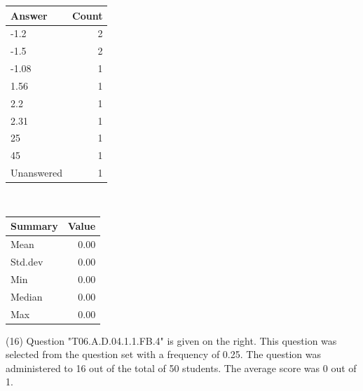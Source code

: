 \documentclass[12pt,english,nohyper]{tufte-handout}\usepackage[]{graphicx}\usepackage[]{color}
\begin{document}
\begin{center}%
\begin{tabular}{lr}
  \hline
Answer & Count \\ 
  \hline
-1.2 &   2 \\ 
  -1.5 &   2 \\ 
  -1.08 &   1 \\ 
  1.56 &   1 \\ 
  2.2 &   1 \\ 
  2.31 &   1 \\ 
  25 &   1 \\ 
  45 &   1 \\ 
  Unanswered &   1 \\ 
   \hline
\end{tabular}
~~~~~~~~%
\begin{tabular}{lr}
  \hline
Summary & Value \\ 
  \hline
Mean & 0.00 \\ 
  Std.dev & 0.00 \\ 
  Min & 0.00 \\ 
  Median & 0.00 \\ 
  Max & 0.00 \\ 
   \hline
\end{tabular}
\end{center}\newpage{} (16) Question "T06.A.D.04.1.1.FB.4" is given on the right. This question was selected from the question set with a frequency of 0.25. The question was administered to 16 out of the total of 50 students. The average score was 0 out of 1.
\end{document}
